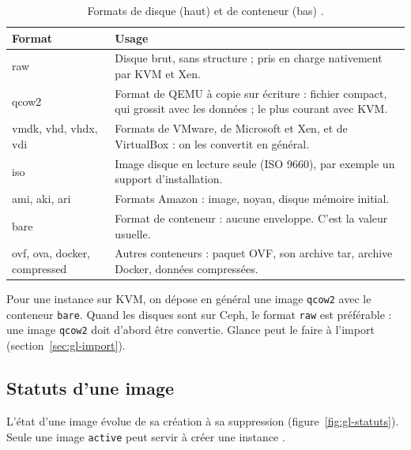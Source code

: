 \begin{table}[!ht]
\centering
\renewcommand{\arraystretch}{1.3}
\begin{tabular}{@{}>{\raggedright\arraybackslash\ttfamily}p{3.0cm}>{\raggedright\arraybackslash}p{12.5cm}@{}}
\toprule
\textrm{\textbf{Format}} & \textbf{Usage} \\
\midrule
raw & Disque brut, sans structure ; pris en charge nativement par KVM et Xen. \\
qcow2 & Format de QEMU à copie sur écriture : fichier compact, qui grossit avec les données ; le plus courant avec KVM. \\
vmdk, vhd, vhdx, vdi & Formats de VMware, de Microsoft et Xen, et de VirtualBox : on les convertit en général. \\
iso & Image disque en lecture seule (ISO 9660), par exemple un support d'installation. \\
ami, aki, ari & Formats Amazon : image, noyau, disque mémoire initial. \\
bare & Format de conteneur : aucune enveloppe. C'est la valeur usuelle. \\
ovf, ova, docker, compressed & Autres conteneurs : paquet OVF, son archive tar, archive Docker, données compressées. \\
\bottomrule
\end{tabular}
\caption{Formats de disque (haut) et de conteneur (bas) \parencite{glance-formats}.}
\label{tab:gl-formats}
\end{table}

\begin{pointcle}
Pour une instance sur KVM, on dépose en général une image \texttt{qcow2} avec le conteneur \texttt{bare}. Quand les
disques sont sur Ceph, le format \texttt{raw} est préférable : une image \texttt{qcow2} doit d'abord être convertie. Glance
peut le faire à l'import (section~\ref{sec:gl-import}).
\end{pointcle}

\subsection{Statuts d'une image}\label{sec:gl-statuts}

L'état d'une image évolue de sa création à sa suppression (figure~\ref{fig:gl-statuts}). Seule une image
\texttt{active} peut servir à créer une instance \parencite{glance-statuses}.

